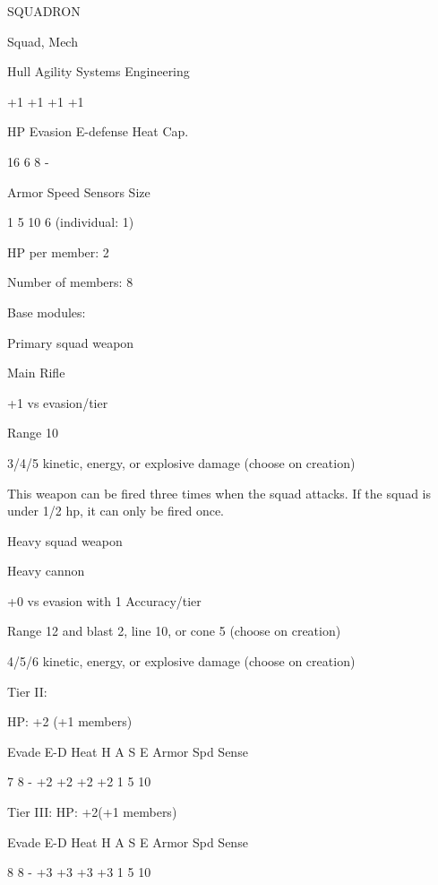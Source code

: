        SQUADRON 

       Squad, Mech 

       Hull       Agility     Systems       Engineering 

       +1         +1          +1            +1 

       HP         Evasion     E-defense     Heat Cap. 

       16         6           8             - 

       Armor      Speed       Sensors       Size 

       1          5           10            6 (individual:  
                                            1) 

HP per member: 2
 
Number of members: 8
 

Base modules:
 
Primary squad weapon
 
Main Rifle
 
+1 vs evasion/tier
 

                                                                                                          


Range 10
 
3/4/5 kinetic, energy, or explosive damage (choose on creation)
 
This weapon can be fired three times when the squad attacks. If the squad is under 1/2 hp, it can  
only be fired once.
 

Heavy squad weapon
 
Heavy cannon
 
+0 vs evasion with 1 Accuracy/tier
 
Range 12 and blast 2, line 10, or cone 5 (choose on creation)
 
4/5/6 kinetic, energy, or explosive damage (choose on creation)
 

Tier II:
 
HP: +2 (+1 members)
 

          Evade    E-D    Heat    H    A     S    E       Armor        Spd      Sense 

          7        8      -       +2   +2    +2   +2       1           5        10 

Tier III:  
HP: +2(+1 members)
 

          Evade    E-D    Heat    H    A     S    E       Armor        Spd      Sense 

         8         8      -       +3   +3    +3   +3       1           5        10 

